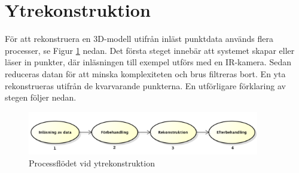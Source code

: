 \documentclass[a4paper,12pt,oneside,final]{extbook}
\begin{document}
\section{Ytrekonstruktion}
För att rekonstruera en 3D-modell utifrån inläst punktdata används flera processer, se Figur \ref{fig:pclflow} nedan. Det första steget innebär att systemet skapar eller läser in punkter, där inläsningen  till exempel utförs med en IR-kamera. Sedan reduceras datan för att minska komplexiteten och brus filtreras bort. En yta rekonstrueras utifrån de kvarvarande punkterna. En utförligare förklaring av stegen följer nedan.

\begin{figure}[h!]
  \centering
  \includegraphics[width=0.9\textwidth]{bilder/rek2siffror.png}
  \caption{Processflödet vid ytrekonstruktion}
  \label{fig:pclflow}
\end{figure}
\end{document}
